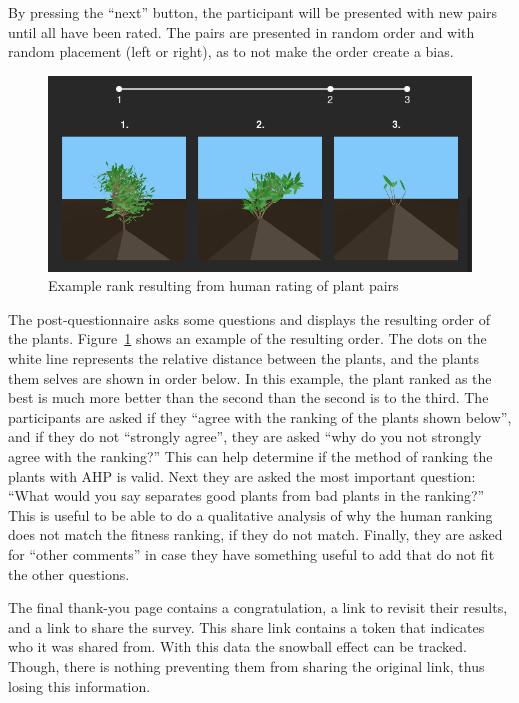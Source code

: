 By pressing the ``next'' button, the participant will be presented with new pairs until all have been rated.
The pairs are presented in random order and with random placement (left or right), as to not make the order create a bias.

\begin{figure}
    \centering
    \includegraphics[width=1.0\textwidth]{figures/rank}
    \caption{Example rank resulting from human rating of plant pairs}
    \label{fig:rank}
\end{figure}

The post-questionnaire asks some questions and displays the resulting order of the plants.
Figure~\ref{fig:rank} shows an example of the resulting order.
The dots on the white line represents the relative distance between the plants, and the plants them selves are shown in order below.
In this example, the plant ranked as the best is much more better than the second than the second is to the third.
The participants are asked if they ``agree with the ranking of the plants shown below'', and if they do not ``strongly agree'', they are asked ``why do you not strongly agree with the ranking?''
This can help determine if the method of ranking the plants with AHP is valid.
Next they are asked the most important question: ``What would you say separates good plants from bad plants in the ranking?''
This is useful to be able to do a qualitative analysis of why the human ranking does not match the fitness ranking, if they do not match.
Finally, they are asked for ``other comments'' in case they have something useful to add that do not fit the other questions.

The final thank-you page contains a congratulation, a link to revisit their results, and a link to share the survey.
This share link contains a token that indicates who it was shared from.
With this data the snowball effect can be tracked.
Though, there is nothing preventing them from sharing the original link, thus losing this information.


